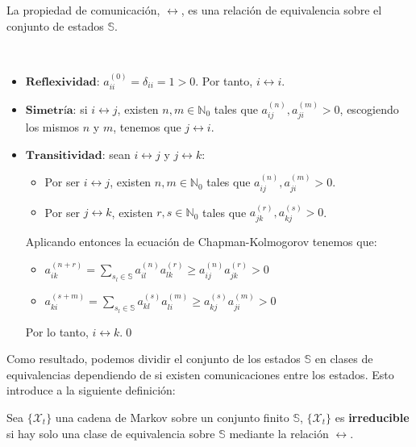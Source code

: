 \begin{theorem}
    La propiedad de comunicación, $\longleftrightarrow$, es una relación de equivalencia sobre el conjunto de estados $\mathbb{S}$.
\end{theorem}
\begin{proofs*}
    \
    \begin{itemize}
        \item $\textbf{Reflexividad: } a_{ii}^{(0)}=\delta_{ii}=1>0$. Por tanto, $i\longleftrightarrow i$.
        \item $\textbf{Simetría:}$ si $i\longleftrightarrow j$, existen $n,m\in\mathbb{N}_0$ tales que $a_{ij}^{(n)}, a_{ji}^{(m)}>0$, escogiendo los mismos $n$ y $m$, tenemos que $j\longleftrightarrow i$.
        \item $\textbf{Transitividad:}$ sean $i\longleftrightarrow j$ y $j\longleftrightarrow k$:
        \begin{itemize}
            \item Por ser $i\longleftrightarrow j$, existen $n,m\in\mathbb{N}_0$ tales que $a_{ij}^{(n)}, a_{ji}^{(m)}>0$.
            \item Por ser $j\longleftrightarrow k$, existen $r,s\in\mathbb{N}_0$ tales que $a_{jk}^{(r)}, a_{kj}^{(s)}>0$.
        \end{itemize}
        Aplicando entonces la ecuación de Chapman-Kolmogorov tenemos que:
        \begin{itemize}
            \item $a_{ik}^{(n+r)}=\sum\limits_{s_l\in\mathbb{S}}a_{il}^{(n)}a_{lk}^{(r)}\geq a_{ij}^{(n)}a_{jk}^{(r)}>0$
            \item $a_{ki}^{(s+m)}=\sum\limits_{s_l\in\mathbb{S}}a_{kl}^{(s)}a_{li}^{(m)}\geq a_{kj}^{(s)}a_{ji}^{(m)}>0$
        \end{itemize}
        Por lo tanto, $i\longleftrightarrow k$.\qed
    \end{itemize}
\end{proofs*}

Como resultado, podemos dividir el conjunto de los estados $\mathbb{S}$ en clases de equivalencias dependiendo de si existen comunicaciones entre los estados. Esto introduce a la siguiente definición:
\begin{definition}
    Sea $\{\mathcal{X}_t\}$ una cadena de Markov sobre un conjunto finito $\mathbb{S}$, $\{\mathcal{X}_t\}$ es \textbf{irreducible} si hay solo una clase de equivalencia sobre $\mathbb{S}$ mediante la relación $\longleftrightarrow$.
\end{definition}

